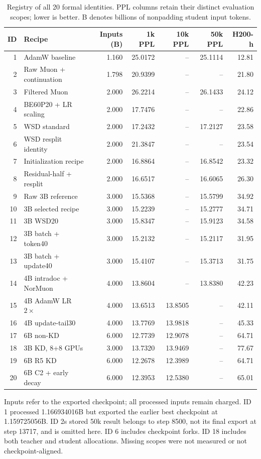 \begin{table}[tbp]
\centering
\small
\caption{Registry of all 20 formal identities. PPL columns retain their distinct evaluation scopes; lower is better. B denotes billions of nonpadding student input tokens.}
\label{tab:formal}
\begin{tabular}{rlrrrrr}
\toprule
ID & Recipe & Inputs (B) & 1k PPL & 10k PPL & 50k PPL & H200-h \\
\midrule
1 & AdamW baseline & 1.160 & 25.0172 & -- & 25.1114 & 12.81 \\
2 & Raw Muon + continuation & 1.798 & 20.9399 & -- & -- & 21.80 \\
3 & Filtered Muon & 2.000 & 26.2214 & -- & 26.1433 & 24.12 \\
4 & BE60P20 + LR scaling & 2.000 & 17.7476 & -- & -- & 22.86 \\
5 & WSD standard & 2.000 & 17.2432 & -- & 17.2127 & 23.58 \\
6 & WSD resplit identity & 2.000 & 21.3847 & -- & -- & 23.54 \\
7 & Initialization recipe & 2.000 & 16.8864 & -- & 16.8542 & 23.32 \\
8 & Residual-half + resplit & 2.000 & 16.6517 & -- & 16.6065 & 26.30 \\
9 & Raw 3B reference & 3.000 & 15.5368 & -- & 15.5799 & 34.92 \\
10 & 3B selected recipe & 3.000 & 15.2239 & -- & 15.2777 & 34.71 \\
11 & 3B WSD20 & 3.000 & 15.8347 & -- & 15.9123 & 34.58 \\
12 & 3B batch + token40 & 3.000 & 15.2132 & -- & 15.2117 & 31.95 \\
13 & 3B batch + update40 & 3.000 & 15.4107 & -- & 15.3713 & 31.75 \\
14 & 4B intradoc + NorMuon & 4.000 & 13.8604 & -- & 13.8380 & 42.23 \\
15 & 4B AdamW LR $2\times$ & 4.000 & 13.6513 & 13.8505 & -- & 42.11 \\
16 & 4B update-tail30 & 4.000 & 13.7769 & 13.9818 & -- & 45.33 \\
17 & 6B non-KD & 6.000 & 12.7739 & 12.9078 & -- & 64.71 \\
18 & 3B KD, 8+8 GPUs & 3.000 & 13.7320 & 13.9469 & -- & 77.67 \\
19 & 6B R5 KD & 6.000 & 12.2678 & 12.3989 & -- & 64.71 \\
20 & 6B C2 + early decay & 6.000 & 12.3953 & 12.5380 & -- & 65.01 \\
\bottomrule
\end{tabular}
\par\vspace{3pt}\begin{minipage}{\linewidth}\footnotesize Inputs refer to the exported checkpoint; all processed inputs remain charged. ID 1 processed 1.166934016B but exported the earlier best checkpoint at 1.159725056B. ID 2\textquotesingle s stored 50k result belongs to step 8500, not its final export at step 13717, and is omitted here. ID 6 includes checkpoint forks. ID 18 includes both teacher and student allocations. Missing scopes were not measured or not checkpoint-aligned.\end{minipage}
\end{table}
